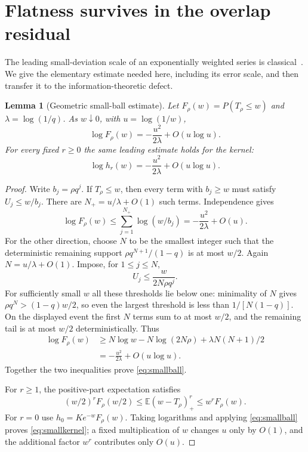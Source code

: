 \documentclass[11pt,oneside]{article}
\numberwithin{equation}{section}
\theoremstyle{plain}
\newtheorem{lemma}[theorem]{Lemma}
\theoremstyle{definition}
\theoremstyle{remark}
\newcommand{\E}{\mathbb E}
\begin{document}
\section{Flatness survives in the overlap residual}
\label{sec:flat}
The leading small-deviation scale of an exponentially weighted series
is classical~\cite{aurzada}. We give the elementary estimate needed
here, including its error scale, and then transfer it to the
information-theoretic defect.

\begin{lemma}[Geometric small-ball estimate]\label{lem:smallball}
Let $F_\rho(w)=P(T_\rho\le w)$ and $\lambda=\log(1/q)$. As
$w\downarrow0$, with $u=\log(1/w)$,
\begin{equation}\label{eq:smallball}
 \log F_\rho(w)=-\frac{u^2}{2\lambda}+O(u\log u).
\end{equation}
For every fixed $r\ge0$ the same leading estimate holds for the
kernel:
\begin{equation}\label{eq:smallkernel}
 \log h_r(w)=-\frac{u^2}{2\lambda}+O(u\log u).
\end{equation}
\end{lemma}
\begin{proof}
Write $b_j=\rho q^j$. If $T_\rho\le w$, then every term with
$b_j\ge w$ must satisfy $U_j\le w/b_j$. There are
$N_+=u/\lambda+O(1)$ such terms. Independence gives
\[
 \log F_\rho(w)
 \le\sum_{j=1}^{N_+}\log(w/b_j)
 =-\frac{u^2}{2\lambda}+O(u).
\]
For the other direction, choose $N$ to be the smallest integer such
that the deterministic remaining support
$\rho q^{N+1}/(1-q)$ is at most $w/2$. Again
$N=u/\lambda+O(1)$. Impose, for $1\le j\le N$,
\[
 U_j\le\frac{w}{2N\rho q^j}.
\]
For sufficiently small $w$ all these thresholds lie below one:
minimality of $N$ gives $\rho q^N>(1-q)w/2$, so even the largest
threshold is less than $1/[N(1-q)]$. On the displayed event the
first $N$ terms sum to at most $w/2$, and the remaining tail is at
most $w/2$ deterministically. Thus
\begin{align*}
 \log F_\rho(w)
 &\ge N\log w-N\log(2N\rho)+\lambda N(N+1)/2\\
 &=-\frac{u^2}{2\lambda}+O(u\log u).
\end{align*}
Together the two inequalities prove \eqref{eq:smallball}.

For $r\ge1$, the positive-part expectation satisfies
\[
 (w/2)^rF_\rho(w/2)
 \le\E(w-T_\rho)_+^r\le w^rF_\rho(w).
\]
For $r=0$ use $h_0=K e^{-w}F_\rho(w)$. Taking logarithms and
applying \eqref{eq:smallball} proves \eqref{eq:smallkernel}; a
fixed multiplication of $w$ changes $u$ only by $O(1)$, and the
additional factor $w^r$ contributes only $O(u)$.
\end{proof}
\end{document}
